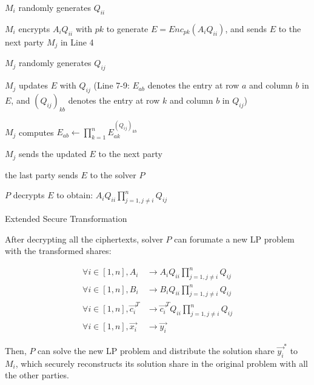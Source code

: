 \begin{algorithm}[!h]
	\small
	\begin{algorithmic}[1]
		\renewcommand{\algorithmicrequire}{\textbf{Input:}}
		\renewcommand{\algorithmicensure}{\textbf{Output:}}

		\STATE $M_i$ randomly generates $Q_{ii}$ 
		
		\STATE $M_i$ encrypts $A_iQ_{ii}$ with $pk$ to generate $E=Enc_{pk}(A_iQ_{ii})$, and sends $E$ to the next party $M_j$ in Line 4
		
		
		\STATE $M_j$ randomly generates $Q_{ij}$ 
		
		
		\STATE $M_j$ updates $E$ with $Q_{ij}$ (Line 7-9: $E_{ab}$ denotes the entry at row $a$ and column $b$ in $E$, and $(Q_{ij})_{kb}$ denotes the entry at row $k$ and column $b$ in $Q_{ij}$)
			
		\STATE $M_j$ computes $E_{ab} \leftarrow \prod^{n}_{k=1} E_{ak}^{(Q_{ij})_{kb}}$
		\ENDFOR
		
		\STATE $M_j$ sends the updated $E$ to the next party
		
		\ENDFOR
		
		\STATE the last party sends $E$ to the solver $P$
		
		\STATE $P$ decrypts $E$ to obtain: $A_iQ_{ii}\prod_{j=1,j\ne i}^nQ_{ij}$
		
		\ENDFOR
	
\end{algorithmic}
	\caption{Extended Secure Transformation}\label{algm:tran}
\end{algorithm}

After decrypting all the ciphertexts, solver $P$ can forumate a new LP problem with the transformed shares:

\begin{align}
\forall i\in[1,n], A_i&\longrightarrow A_iQ_{ii}\prod_{j=1,j\ne i}^nQ_{ij}\nonumber\\
\forall i\in[1,n], B_i&\longrightarrow B_iQ_{ii}\prod_{j=1,j\ne i}^nQ_{ij}\nonumber\\
\forall i\in[1,n], \vec{c_i}^T&\longrightarrow \vec{c_i}^TQ_{ii}\prod_{j=1,j\ne i}^nQ_{ij}\nonumber\\
\forall i\in[1,n], \vec{x_i}&\longrightarrow \vec{y_i}
\label{eq:newtrans}  
\end{align}

Then, $P$ can solve the new LP problem and distribute the solution share $\vec{y_i}^*$ to $M_i$, which securely reconstructs its solution share in the original problem with all the other parties.


